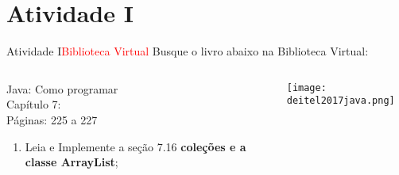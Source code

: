 \documentclass[11pt,aspectratio=43,ignorenonframetext,t]{beamer}
\begin{document}
\section{Atividade I}
\begin{frame}{Atividade I}{\textcolor{red}{Biblioteca Virtual}}
 Busque o livro abaixo na Biblioteca Virtual:
  \begin{columns}
   \begin{column}{0.4\textwidth}
     Java: Como programar\\
     Capítulo 7: \cite{deitel2017java}\\
     Páginas: 225 a 227\\
     
     \begin{enumerate}
      \item Leia e Implemente a seção 7.16 \textbf{coleções e a classe 
ArrayList};
     \end{enumerate}     
   \end{column}
   \begin{column}{0.3\textwidth}
    \begin{center}
  \texttt{[image: deitel2017java.png]} \\
 \end{center}
   \end{column}
 \end{columns}
 
 \end{frame}
\end{document}
